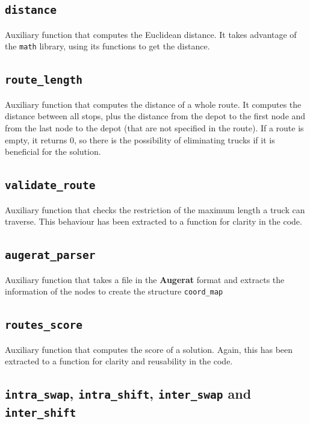 \documentclass[11pt]{article}
\begin{document}
\subsection{\texttt{distance}}

Auxiliary function that computes the Euclidean distance. It takes advantage of the \texttt{math} library, using its functions to get the distance. \\

\subsection{\texttt{route\_length}}

Auxiliary function that computes the distance of a whole route. It computes the distance between all stops, plus the distance from the depot to the first node and from the last node to the depot (that are not specified in the route). If a route is empty, it returns $0$, so there is the possibility of eliminating trucks if it is beneficial for the solution. \\

\subsection{\texttt{validate\_route}}

Auxiliary function that checks the restriction of the maximum length a truck can traverse. This behaviour has been extracted to a function for clarity in the code. \\

\subsection{\texttt{augerat\_parser}}

Auxiliary function that takes a file in the \textbf{Augerat} format and extracts the information of the nodes to create the structure \texttt{coord\_map} \\

\subsection{\texttt{routes\_score}}

Auxiliary function that computes the score of a solution. Again, this has been extracted to a function for clarity and reusability in the code. \\

\subsection{\texttt{intra\_swap}, \texttt{intra\_shift}, \texttt{inter\_swap} and \texttt{inter\_shift}}
\end{document}
